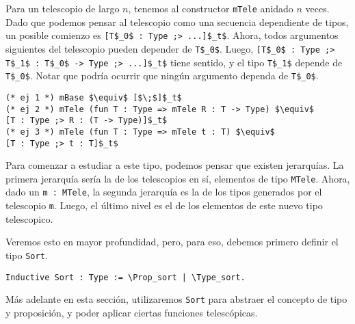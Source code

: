 Para un telescopio de largo $n$, tenemos al constructor \lstinline{mTele} anidado $n$ veces. Dado que podemos pensar al telescopio como una secuencia dependiente de tipos, un posible comienzo es \lstinline{[T$_0$ : Type ;> ...]$_t$}. Ahora, todos argumentos siguientes del telescopio pueden depender de \lstinline{T$_0$}. Luego, \lstinline{[T$_0$ : Type ;> T$_1$ : T$_0$ -> Type ;> ...]$_t$} tiene sentido, y el tipo \lstinline{T$_1$} depende de \lstinline{T$_0$}.
Notar que podría ocurrir que ningún argumento dependa de \lstinline{T$_0$}.

\begin{lstlisting}[frame=tb,caption={Notación de telescopios},label=lst:not_tele]
(* ej 1 *) mBase $\equiv$ [$\;$]$_t$
(* ej 2 *) mTele (fun T : Type => mTele R : T -> Type) $\equiv$
[T : Type ;> R : (T -> Type)]$_t$
(* ej 3 *) mTele (fun T : Type => mTele t : T) $\equiv$
[T : Type ;> t : T]$_t$
\end{lstlisting}

Para comenzar a estudiar a este tipo, podemos pensar que existen jerarquías.
La primera jerarquía sería la de los telescopios en sí, elementos de tipo \lstinline{MTele}.
Ahora, dado un \lstinline{m : MTele}, la segunda jerarquía es la de los tipos generados por el telescopio \lstinline{m}.
Luego, el último nivel es el de los elementos de este nuevo tipo telescopico.

Veremos esto en mayor profundidad, pero, para eso, debemos primero definir el tipo \lstinline{Sort}.

\begin{lstlisting}[frame=tb,caption={Definición de \lstinline{Sort}},label=lst:Sort]
Inductive Sort : Type := \Prop_sort | \Type_sort.
\end{lstlisting}

Más adelante en esta sección, utilizaremos \lstinline{Sort} para abstraer el concepto de tipo y proposición, y poder aplicar ciertas funciones telescópicas.

